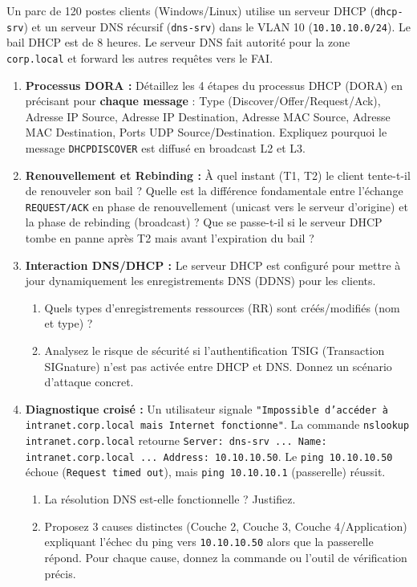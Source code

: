 \documentclass[11pt]{article}
\begin{document}
\begin{exercice}
Un parc de 120 postes clients (Windows/Linux) utilise un serveur DHCP (\texttt{dhcp-srv}) et un serveur DNS récursif (\texttt{dns-srv}) dans le VLAN 10 (\texttt{10.10.10.0/24}). Le bail DHCP est de 8 heures. Le serveur DNS fait autorité pour la zone \texttt{corp.local} et forward les autres requêtes vers le FAI.
\begin{enumerate}
    \item \textbf{Processus DORA :} Détaillez les 4 étapes du processus DHCP (DORA) en précisant pour \textbf{chaque message} : Type (Discover/Offer/Request/Ack), Adresse IP Source, Adresse IP Destination, Adresse MAC Source, Adresse MAC Destination, Ports UDP Source/Destination. Expliquez pourquoi le message \texttt{DHCPDISCOVER} est diffusé en broadcast L2 et L3.
    \item \textbf{Renouvellement et Rebinding :} À quel instant (T1, T2) le client tente-t-il de renouveler son bail ? Quelle est la différence fondamentale entre l'échange \texttt{REQUEST/ACK} en phase de renouvellement (unicast vers le serveur d'origine) et la phase de rebinding (broadcast) ? Que se passe-t-il si le serveur DHCP tombe en panne après T2 mais avant l'expiration du bail ?
    \item \textbf{Interaction DNS/DHCP :} Le serveur DHCP est configuré pour mettre à jour dynamiquement les enregistrements DNS (DDNS) pour les clients.
        \begin{enumerate}
            \item Quels types d'enregistrements ressources (RR) sont créés/modifiés (nom et type) ?
            \item Analysez le risque de sécurité si l'authentification TSIG (Transaction SIGnature) n'est pas activée entre DHCP et DNS. Donnez un scénario d'attaque concret.
        \end{enumerate}
    \item \textbf{Diagnostique croisé :} Un utilisateur signale \texttt{"Impossible d'accéder à intranet.corp.local mais Internet fonctionne"}. La commande \texttt{nslookup intranet.corp.local} retourne \texttt{Server: dns-srv ... Name: intranet.corp.local ... Address: 10.10.10.50}. Le \texttt{ping 10.10.10.50} échoue (\texttt{Request timed out}), mais \texttt{ping 10.10.10.1} (passerelle) réussit.
        \begin{enumerate}
            \item La résolution DNS est-elle fonctionnelle ? Justifiez.
            \item Proposez 3 causes distinctes (Couche 2, Couche 3, Couche 4/Application) expliquant l'échec du ping vers \texttt{10.10.10.50} alors que la passerelle répond. Pour chaque cause, donnez la commande ou l'outil de vérification précis.
        \end{enumerate}
\end{enumerate}
\end{exercice}
\end{document}
